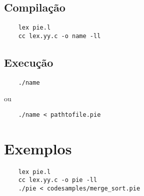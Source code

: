 \documentclass[12pt]{report}
\begin{document}
\section{Compilação}
\begin{verbatim}
    lex pie.l
    cc lex.yy.c -o name -ll
\end{verbatim}

\section{Execução}
\begin{verbatim}
    ./name
\end{verbatim}

ou

\begin{verbatim}
    ./name < pathtofile.pie
\end{verbatim}

\chapter{Exemplos}

\begin{verbatim}
    lex pie.l
    cc lex.yy.c -o pie -ll
    ./pie < codesamples/merge_sort.pie
\end{verbatim}

\newpage


\nocite{*}


\end{document}
